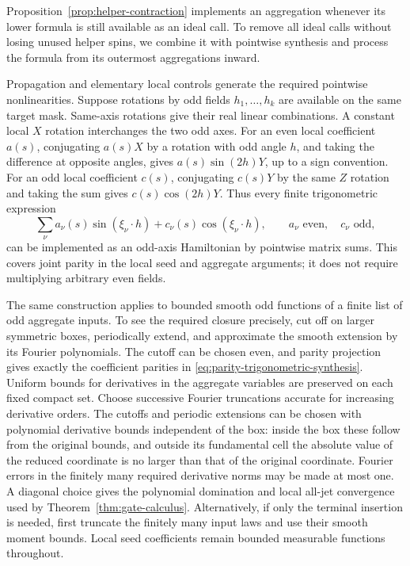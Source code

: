 Proposition~\ref{prop:helper-contraction} implements an aggregation
whenever its lower formula is still available as an ideal call.  To
remove all ideal calls without losing unused helper spins, we combine
it with pointwise synthesis and process the formula from its outermost
aggregations inward.

Propagation and elementary local controls generate the required
pointwise nonlinearities.  Suppose rotations by odd fields
\(h_1,\ldots,h_k\) are available on the same target mask.  Same-axis
rotations give their real linear combinations.  A constant local
\(X\) rotation interchanges the two odd axes.  For an even local
coefficient \(a(s)\), conjugating \(a(s)X\) by a rotation with odd
angle \(h\), and taking the difference at opposite angles, gives
\(a(s)\sin(2h)Y\), up to a sign convention.  For an odd local
coefficient \(c(s)\), conjugating \(c(s)Y\) by the same \(Z\)
rotation and taking the sum gives \(c(s)\cos(2h)Y\).
Thus every finite trigonometric expression
\begin{equation}
 \sum_\nu a_\nu(s)\sin(\xi_\nu\cdot h)
       +c_\nu(s)\cos(\xi_\nu\cdot h),
 \qquad a_\nu\text{ even},\quad c_\nu\text{ odd},
 \label{eq:parity-trigonometric-synthesis}
\end{equation}
can be implemented as an odd-axis Hamiltonian by pointwise matrix
sums.  This covers joint parity in the local seed and aggregate
arguments; it does not require multiplying arbitrary even fields.

The same construction applies to bounded smooth odd functions of a
finite list of odd aggregate inputs.  To see the required closure
precisely, cut off on larger symmetric boxes, periodically extend,
and approximate the smooth extension by its Fourier polynomials.
The cutoff can be chosen even, and parity projection gives exactly
the coefficient parities in
\eqref{eq:parity-trigonometric-synthesis}.  Uniform bounds for
derivatives in the aggregate variables are preserved on each fixed
compact set.  Choose successive Fourier truncations accurate for
increasing derivative orders.  The cutoffs and periodic extensions
can be chosen with polynomial derivative bounds independent of the
box: inside the box these follow from the original bounds, and
outside its fundamental cell the absolute value of the reduced
coordinate is no larger than that of the original coordinate.
Fourier errors in the finitely many required derivative norms may
be made at most one.  A diagonal choice gives the polynomial
domination and local all-jet convergence used by
Theorem~\ref{thm:gate-calculus}.  Alternatively, if only the terminal
insertion is needed, first truncate the finitely many input laws and
use their smooth moment bounds.  Local seed coefficients remain
bounded measurable functions throughout.

